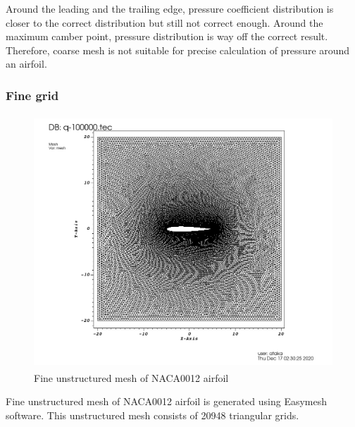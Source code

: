 \documentclass[letterpaper,12pt]{article}
\begin{document}
\vspace{2cm}

Around the leading and the trailing edge, pressure coefficient distribution is 
closer to the correct distribution but still not correct enough. Around the maximum
camber point, pressure distribution is way off the correct result. Therefore, coarse
mesh is not suitable for precise calculation of pressure around an airfoil.

\newpage

\subsubsection{Fine grid}

\begin{figure} [!h]
	\centering
	\includegraphics[height = 9.5cm]{graph/fine/fine_209480000.png}
	\caption{Fine unstructured mesh of NACA0012 airfoil}
    \label{fig:airfoilmeshfine}
\end{figure}

Fine unstructured mesh of NACA0012 airfoil is generated using Easymesh software. This 
unstructured mesh consists of 20948 triangular grids.

\newpage
\end{document}
